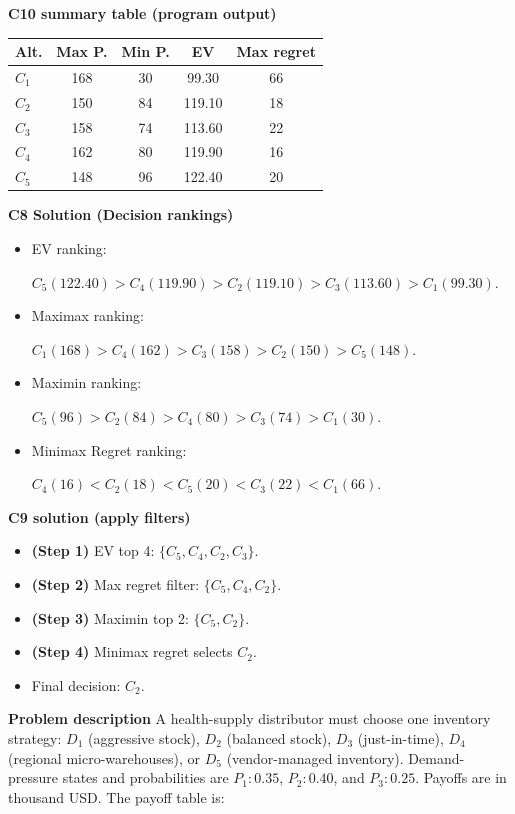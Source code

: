 \begin{ExamProblems}
		\vspace{0.25cm}
		
		\textbf{C10 summary table (program output)}\par
		\begin{center}
			\begin{tabular}{l c c c c}
				\hline
				Alt. & Max P. & Min P. & EV & Max regret \\
				\hline
				$C_1$ & 168 & 30 & 99.30 & 66 \\
				$C_2$ & 150 & 84 & 119.10 & 18 \\
				$C_3$ & 158 & 74 & 113.60 & 22 \\
				$C_4$ & 162 & 80 & 119.90 & 16 \\
				$C_5$ & 148 & 96 & 122.40 & 20 \\
				\hline
			\end{tabular}
		\end{center}
		
		\textbf{C8 Solution (Decision rankings)}\par
		\begin{itemize}
			\item EV ranking: \par $C_5(122.40)>C_4(119.90)>C_2(119.10)>C_3(113.60)>C_1(99.30)$.
			\item Maximax ranking:\par $C_1(168)>C_4(162)>C_3(158)>C_2(150)>C_5(148)$.
			\item Maximin ranking: \par $C_5(96)>C_2(84)>C_4(80)>C_3(74)>C_1(30)$.
			\item Minimax Regret ranking:\par $C_4(16)<C_2(18)<C_5(20)<C_3(22)<C_1(66)$.
		\end{itemize}
		
		\textbf{C9 solution (apply filters)}\par
		\begin{itemize}
			\item \textbf{(Step 1)} EV top 4: $\{C_5,C_4,C_2,C_3\}$.
			\item \textbf{(Step 2)} Max regret filter: $\{C_5,C_4,C_2\}$.
			\item \textbf{(Step 3)} Maximin top 2: $\{C_5,C_2\}$.
			\item \textbf{(Step 4)} Minimax regret selects $C_2$.
			\item Final decision: $C_2$.
		\end{itemize}
		
		\newpage
		\item
		\textbf{Problem description}
		A health-supply distributor must choose one inventory strategy: $D_1$ (aggressive stock), $D_2$ (balanced stock), $D_3$ (just-in-time), $D_4$ (regional micro-warehouses), or $D_5$ (vendor-managed inventory).
		Demand-pressure states and probabilities are $P_1:0.35$, $P_2:0.40$, and $P_3:0.25$. Payoffs are in thousand USD. The payoff table is:
		

\end{ExamProblems}
